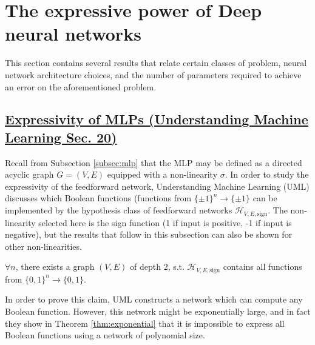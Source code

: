 \documentclass{article}
\begin{document}
\section{The expressive power of Deep neural networks}
\label{sec:expressive-dnns}
This section contains several results that relate certain classes of problem, neural network architecture choices, and the number of parameters required to achieve an error on the aforementioned problem. 

\subsection{\href{https://www.cs.huji.ac.il/~shais/UnderstandingMachineLearning/understanding-machine-learning-theory-algorithms.pdf}{Expressivity of MLPs (Understanding Machine Learning Sec. 20)}}
Recall from Subsection \ref{subsec:mlp} that the MLP may be defined as a directed acyclic graph $G = (V, E)$ equipped with a non-linearity $\sigma$. In order to study the expressivity of the feedforward network, Understanding Machine Learning (UML) \citep{Shalev-Shwartz:2014:UML:2621980} discusses which Boolean functions (functions from $\{\pm 1\}^n \to \{\pm 1\}$ can be implemented by the hypothesis class of feedforward networks $\mathcal{H}_{V, E, \text{sign}}$. The non-linearity selected here is the sign function (1 if input is positive, -1 if input is negative), but the results that follow in this subsection can also be shown for other non-linearities.

\begin{clm}
$\forall n$, there exists a graph $(V, E)$ of depth 2, s.t. $\mathcal{H}_{V, E, \text{sign}}$ contains all functions from $\{0, 1\}^n \to \{0, 1\}$.
\end{clm}

In order to prove this claim, UML \citep{Shalev-Shwartz:2014:UML:2621980} constructs a network which can compute any Boolean function. However, this network might be exponentially large, and in fact they show in Theorem \ref{thm:exponential} that it is impossible to express all Boolean functions using a network of polynomial size.
\end{document}

